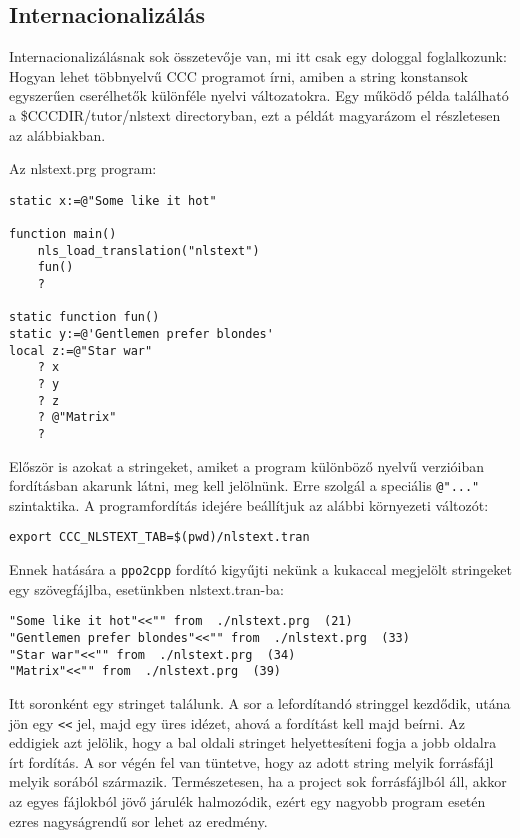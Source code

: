 \subsection{Internacionalizálás}

Internacionalizálásnak sok összetevője van, 
mi itt csak egy dologgal foglalkozunk: 
Hogyan lehet többnyelvű CCC programot írni, 
amiben a string konstansok egyszerűen cserélhetők különféle 
nyelvi változatokra. 
Egy működő példa található a \$CCCDIR/tutor/nlstext directoryban, 
ezt a példát magyarázom el részletesen az alábbiakban.

Az nlstext.prg program:
\begin{verbatim}
static x:=@"Some like it hot"

function main()
    nls_load_translation("nlstext")
    fun()
    ?

static function fun()
static y:=@'Gentlemen prefer blondes'
local z:=@"Star war"
    ? x
    ? y
    ? z
    ? @"Matrix"
    ?
\end{verbatim}
Először is azokat a stringeket, amiket a program különböző 
nyelvű verzióiban fordításban akarunk látni, meg kell jelölnünk.
Erre szolgál a speciális \verb!@"..."! szintaktika.
A programfordítás idejére beállítjuk az alábbi 
környezeti változót:
\begin{verbatim}
export CCC_NLSTEXT_TAB=$(pwd)/nlstext.tran
\end{verbatim}
Ennek hatására a \verb!ppo2cpp! fordító kigyűjti nekünk a 
kukaccal megjelölt stringeket egy szövegfájlba, 
esetünkben nlstext.tran-ba:
\begin{verbatim}
"Some like it hot"<<"" from  ./nlstext.prg  (21)
"Gentlemen prefer blondes"<<"" from  ./nlstext.prg  (33)
"Star war"<<"" from  ./nlstext.prg  (34)
"Matrix"<<"" from  ./nlstext.prg  (39)
\end{verbatim}
Itt soronként egy stringet találunk. A sor a lefordítandó
stringgel kezdődik, utána jön egy \verb!<<! jel, majd egy 
üres idézet, ahová a fordítást kell majd beírni.
Az eddigiek azt jelölik, hogy a bal oldali stringet 
helyettesíteni fogja a jobb oldalra írt fordítás.
A sor végén fel van tüntetve, hogy az adott string melyik
forrásfájl melyik sorából származik.  Természetesen,
ha a project sok forrásfájlból áll, akkor az egyes fájlokból
jövő járulék halmozódik, ezért egy nagyobb program esetén
ezres nagyságrendű sor lehet az eredmény.

